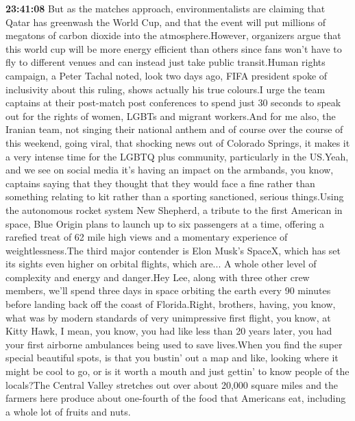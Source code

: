 \documentclass{article}%
\begin{document}
\textbf{23:41:08}%
\newline%
But as the matches approach, environmentalists are claiming that Qatar has greenwash the World Cup, and that the event will put millions of megatons of carbon dioxide into the atmosphere.However, organizers argue that this world cup will be more energy efficient than others since fans won't have to fly to different venues and can instead just take public transit.Human rights campaign, a Peter Tachal noted, look two days ago, FIFA president spoke of inclusivity about this ruling, shows actually his true colours.I urge the team captains at their post{-}match post conferences to spend just 30 seconds to speak out for the rights of women, LGBTs and migrant workers.And for me also, the Iranian team, not singing their national anthem and of course over the course of this weekend, going viral, that shocking news out of Colorado Springs, it makes it a very intense time for the LGBTQ plus community, particularly in the US.Yeah, and we see on social media it's having an impact on the armbands, you know, captains saying that they thought that they would face a fine rather than something relating to kit rather than a sporting sanctioned, serious things.Using the autonomous rocket system New Shepherd, a tribute to the first American in space, Blue Origin plans to launch up to six passengers at a time, offering a rarefied treat of 62 mile high views and a momentary experience of weightlessness.The third major contender is Elon Musk's SpaceX, which has set its sights even higher on orbital flights, which are... A whole other level of complexity and energy and danger.Hey Lee, along with three other crew members, we'll spend three days in space orbiting the earth every 90 minutes before landing back off the coast of Florida.Right, brothers, having, you know, what was by modern standards of very unimpressive first flight, you know, at Kitty Hawk, I mean, you know, you had like less than 20 years later, you had your first airborne ambulances being used to save lives.When you find the super special beautiful spots, is that you bustin' out a map and like, looking where it might be cool to go, or is it worth a mouth and just gettin' to know people of the locals?The Central Valley stretches out over about 20,000 square miles and the farmers here produce about one{-}fourth of the food that Americans eat, including a whole lot of fruits and nuts.%
\end{document}
